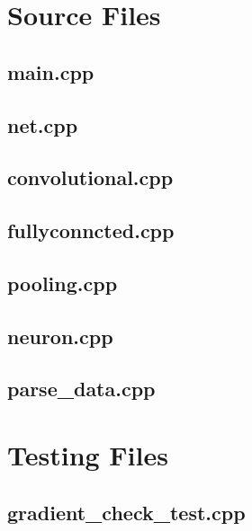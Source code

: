 \section{Source Files}

\subsection{main.cpp}

\pagebreak


\subsection{net.cpp}

\pagebreak

\subsection{convolutional.cpp}

\pagebreak

\subsection{fullyconncted.cpp}

\pagebreak

\subsection{pooling.cpp}

\pagebreak

\subsection{neuron.cpp}

\pagebreak

\subsection{parse\_data.cpp}

\pagebreak


\section{Testing Files}
\subsection{gradient\_check\_test.cpp}

\pagebreak

